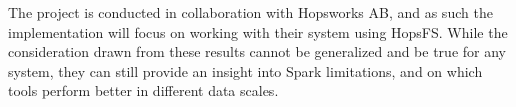 The project is conducted in collaboration with Hopsworks \gls{AB}, and as such the implementation will focus on working with their system using \gls{HopsFS}. While the consideration drawn from these results cannot be generalized and be true for any system, they can still provide an insight into Spark limitations, and on which tools perform better in different data scales. 